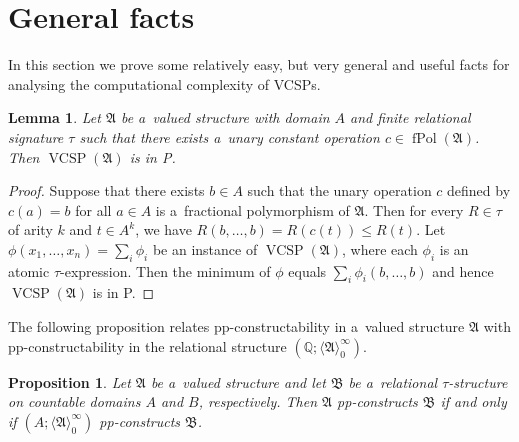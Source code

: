 \documentclass[preprint,12pt]{elsarticle}
\newcommand{\Q}{\mathbb Q}
\newcommand{\bA}{{\mathfrak A}}
\newcommand{\bB}{{\mathfrak B}}
\newcommand{\checked}[1]{#1}
\DeclareMathOperator{\fPol}{fPol}
\DeclareMathOperator{\vcsp}{VCSP}
\newtheorem{lemma}[theorem]{Lemma}
\newtheorem{proposition}[theorem]{Proposition}
\begin{document}
\section{General facts}
\label{sect:gen-facts}
In this section we \checked{prove}
some relatively easy, but very general and useful facts for analysing the computational complexity of VCSPs. 

\begin{lemma}\label{lem:constant-pol}
Let $\bA$ be a~valued structure with domain $A$ and finite relational signature $\tau$ such that there exists a~unary constant operation $c \in \fPol(\bA)$. 
Then $\vcsp(\bA)$ is in P. 
\end{lemma}
\begin{proof}
Suppose that there exists $b \in A$ such that the unary operation $c$ defined by $c(a) = b$ for all $a \in A$ is a~fractional polymorphism of $\bA$.
Then for every $R \in \tau$ of arity $k$ and $t \in A^k$, we have $R(b, \dots, b)=R(c(t)) \leq R(t)$.
Let $\phi(x_1,\dots,x_n) = \sum_i \phi_i$ be an instance of $\vcsp(\bA)$, where each $\phi_i$ is an atomic $\tau$-expression. 
Then the minimum 
of $\phi$ equals $\sum_i \phi_i(b,\dots,b)$ and hence
$\vcsp(\checked{\bA})$ is in P. 
\end{proof} 

%
The following proposition relates pp-constructability in a~valued structure $\bA$ with pp-constructability in the relational structure $(\Q; \langle \bA \rangle_0^\infty)$.

\begin{proposition}\label{prop:pp-constr-rel}
Let $\bA$ be a~valued structure and let $\bB$ be a~relational $\tau$-structure on countable domains $A$ and $B$, respectively. Then $\bA$ pp-constructs $\bB$ if and only if $(A; \langle \bA \rangle_0^\infty)$ pp-constructs $\bB$.
\end{proposition}
\end{document}
